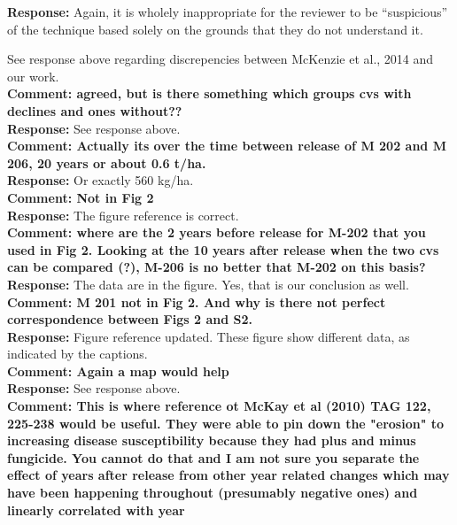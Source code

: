 \documentclass{article} \usepackage[margin=1in]{geometry}
\begin{document}
\textbf{Response: } Again, it is wholely inappropriate for the
reviewer to be ``suspicious'' of the technique based solely on the
grounds that they do not understand it.

See response above regarding discrepencies between McKenzie et al.,
2014 and our work.\\

\textbf{Comment: agreed, but is there something which groups cvs with
  declines and ones without??}\\

\textbf{Response: } See response above.\\

\textbf{Comment: Actually its over the time between release of M 202
  and M 206, 20 years or about 0.6 t/ha.}\\

\textbf{Response: } Or exactly 560 kg/ha. \\

\textbf{Comment: Not in Fig 2 }\\

\textbf{Response: } The figure reference is correct.\\

\textbf{Comment: where are the 2 years before release for M-202 that
  you used in Fig 2. Looking at the  10 years after release when the
  two cvs can be compared (?), M-206 is no better that M-202 on this
  basis?}\\

\textbf{Response: } The data are in the figure. Yes, that is our conclusion as well.\\

\textbf{Comment: M 201 not in Fig 2. And why is there not perfect
  correspondence between Figs 2 and S2.}\\

\textbf{Response: } Figure reference updated. These figure show
different data, as indicated by the captions.\\

\textbf{Comment: Again a map would help}\\

\textbf{Response: } See response above.\\

\textbf{Comment: This is where reference ot McKay et al (2010) TAG
  122, 225-238 would be useful. They were able to pin down the
  "erosion" to increasing disease susceptibility because they had plus
  and minus fungicide. You cannot do that and I am not sure you
  separate the effect of years after release from other year related
  changes which may have been happening throughout (presumably
  negative ones) and linearly correlated with year} \\
\end{document}
